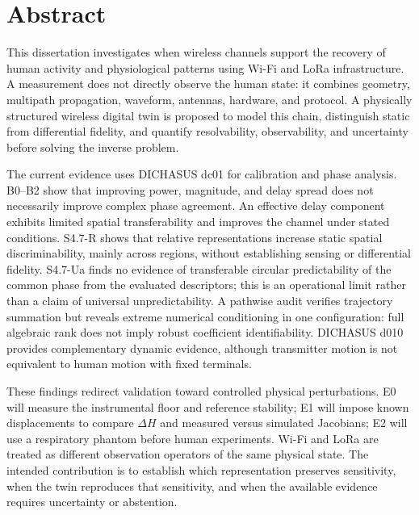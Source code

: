 \chapter*{Abstract}

This dissertation investigates when wireless channels support the recovery of human activity and physiological patterns using Wi-Fi and LoRa infrastructure. A measurement does not directly observe the human state: it combines geometry, multipath propagation, waveform, antennas, hardware, and protocol. A physically structured wireless digital twin is proposed to model this chain, distinguish static from differential fidelity, and quantify resolvability, observability, and uncertainty before solving the inverse problem.

The current evidence uses DICHASUS dc01 for calibration and phase analysis. B0--B2 show that improving power, magnitude, and delay spread does not necessarily improve complex phase agreement. An effective delay component exhibits limited spatial transferability and improves the channel under stated conditions. S4.7-R shows that relative representations increase static spatial discriminability, mainly across regions, without establishing sensing or differential fidelity. S4.7-Ua finds no evidence of transferable circular predictability of the common phase from the evaluated descriptors; this is an operational limit rather than a claim of universal unpredictability. A pathwise audit verifies trajectory summation but reveals extreme numerical conditioning in one configuration: full algebraic rank does not imply robust coefficient identifiability. DICHASUS d010 provides complementary dynamic evidence, although transmitter motion is not equivalent to human motion with fixed terminals.

These findings redirect validation toward controlled physical perturbations. E0 will measure the instrumental floor and reference stability; E1 will impose known displacements to compare $\Delta H$ and measured versus simulated Jacobians; E2 will use a respiratory phantom before human experiments. Wi-Fi and LoRa are treated as different observation operators of the same physical state. The intended contribution is to establish which representation preserves sensitivity, when the twin reproduces that sensitivity, and when the available evidence requires uncertainty or abstention.
